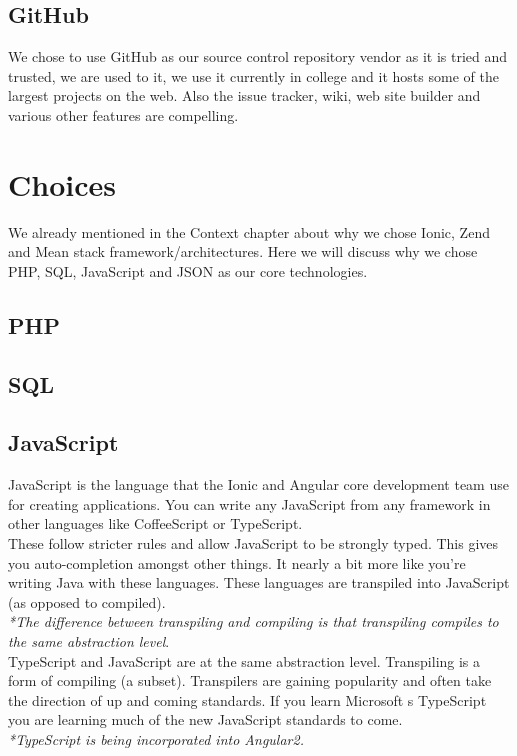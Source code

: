\subsection{GitHub}
We chose to use GitHub as our source control repository vendor as it is tried and trusted, we are used to it, we use it currently in college and it hosts some of the largest projects on the web. Also the issue tracker, wiki, web site builder and various other features are compelling.

\section{Choices}
We already mentioned in the Context chapter about why we chose Ionic, Zend and Mean stack framework/architectures.
Here we will discuss why we chose PHP, SQL, JavaScript and JSON as our core technologies.
\subsection{PHP}
\subsection{SQL}
\subsection{JavaScript}
JavaScript is the language that the Ionic and Angular core development team use for creating applications.
You can write any JavaScript from any framework in other languages like CoffeeScript or TypeScript.
\\

These follow stricter rules and allow JavaScript to be strongly typed.
This gives you auto-completion amongst other things.
It nearly a bit more like you're writing Java with these languages.
These languages are transpiled into JavaScript (as opposed to compiled).
\\
\textit{*The difference between transpiling and compiling is that transpiling compiles to the same abstraction level}.
\\

TypeScript and JavaScript are at the same abstraction level.
Transpiling is a form of compiling (a subset).
Transpilers are gaining popularity and often take the direction of up and coming standards.
If you learn Microsoft s TypeScript you are learning much of the new JavaScript standards to come.
\\
\textit{*TypeScript is being incorporated into Angular2.}
\\

